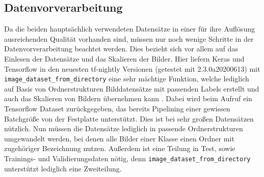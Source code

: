 \documentclass[11pt,bibliography=totocnumbered]{scrartcl}
\begin{document}
\subsection{Datenvorverarbeitung}
Da die beiden hauptsächlich verwendeten Datensätze in einer für ihre Auflösung ausreichenden Qualität vorhanden sind, müssen nur noch wenige Schritte in der Datenvorverarbeitung beachtet werden. Dies bezieht sich vor allem auf das Einlesen der Datensätze und das Skalieren der Bilder. Hier liefern Keras und Tensorflow in den neuesten tf-nightly Versionen (getestet mit 2.3.0a20200613) mit \lstinline[language=pythoninline]|image_dataset_from_directory| eine sehr mächtige Funktion, welche lediglich auf Basis von Ordnerstrukturen Bilddatensätze mit passenden Labels erstellt und auch das Skalieren von Bildern übernehmen kann \cite{KERAS_IMAGE_PREPROCESSING}. Dabei wird beim Aufruf ein Tensorflow Dataset zurückgegeben, das bereits Pipelining einer gewissen Batchgröße von der Festplatte unterstützt. Dies ist bei sehr großen Datensätzen nützlich. Nun müssen die Datensätze lediglich in passende Ordnerstrukturen umgewandelt werden, bei denen alle Bilder einer Klasse einen Ordner mit zugehöriger Bezeichnung nutzen. Außerdem ist eine Teilung in Test, sowie Trainings- und Validierungsdaten nötig, denn \lstinline[language=pythoninline]|image_dataset_from_directory| unterstützt lediglich eine Zweiteilung. 
\end{document}
